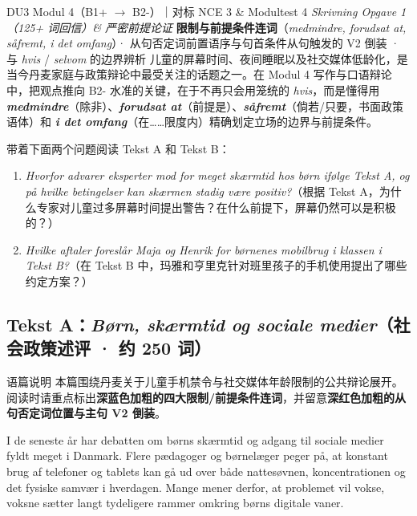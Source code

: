 {DU3 Modul 4（B1+ $\rightarrow$ B2-）｜对标 NCE 3 \& Modultest 4 \textit{Skrivning Opgave 1（125+ 词回信）\& 严密前提论证}}
{\textbf{限制与前提条件连词}（\textit{medmindre, forudsat at, såfremt, i det omfang}）· 从句否定词前置语序与句首条件从句触发的 V2 倒装 · 与 \textit{hvis} / \textit{selvom} 的边界辨析}
{儿童的屏幕时间、夜间睡眠以及社交媒体低龄化，是当今丹麦家庭与政策辩论中最受关注的话题之一。在 Modul 4 写作与口语辩论中，把观点推向 B2- 水准的关键，在于不再只会用笼统的 \textit{hvis}，而是懂得用 \textbf{\textit{medmindre}}（除非）、\textbf{\textit{forudsat at}}（前提是）、\textbf{\textit{såfremt}}（倘若/只要，书面政策语体）和 \textbf{\textit{i det omfang}}（在……限度内）精确划定立场的边界与前提条件。}

\begin{foerduleaeser}
带着下面两个问题阅读 Tekst A 和 Tekst B：
\begin{enumerate}
  \item \textit{Hvorfor advarer eksperter mod for meget skærmtid hos børn ifølge Tekst A, og på hvilke betingelser kan skærmen stadig være positiv?}（根据 Tekst A，为什么专家对儿童过多屏幕时间提出警告？在什么前提下，屏幕仍然可以是积极的？）
  \item \textit{Hvilke aftaler foreslår Maja og Henrik for børnenes mobilbrug i klassen i Tekst B?}（在 Tekst B 中，玛雅和亨里克针对班里孩子的手机使用提出了哪些约定方案？）
\end{enumerate}
\end{foerduleaeser}


\subsection*{Tekst A：\textit{Børn, skærmtid og sociale medier}（社会政策述评 · 约 250 词）}

\begin{tipbox}{语篇说明}
本篇围绕丹麦关于儿童手机禁令与社交媒体年龄限制的公共辩论展开。阅读时请重点标出\textbf{\color{NCDNavy}深蓝色加粗的四大限制/前提条件连词}，并留意\textbf{\color{NCDRed}深红色加粗的从句否定词位置与主句 V2 倒装}。
\end{tipbox}

I de seneste år har debatten om børns skærmtid og adgang til sociale medier fyldt meget i Danmark. Flere pædagoger og børnelæger peger på, at konstant brug af telefoner og tablets kan gå ud over både nattesøvnen, koncentrationen og det fysiske samvær i hverdagen. Mange mener derfor, at problemet vil vokse,  voksne sætter langt tydeligere rammer omkring børns digitale vaner.

